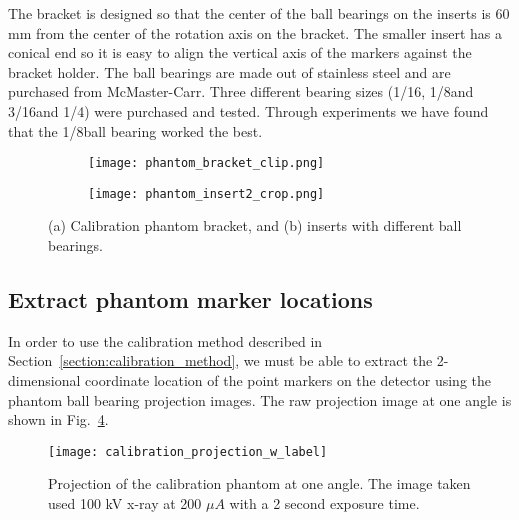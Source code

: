 The bracket is designed so that the center of the ball bearings on the inserts is 60 mm from the center of the rotation axis on the bracket.  The smaller insert has a conical end so it is easy to align the vertical axis of the markers against the bracket holder.  The ball bearings are made out of stainless steel and are purchased from McMaster-Carr.  Three different bearing sizes (1/16\inches, 1/8\inches and 3/16\inches and 1/4\inches) were purchased and tested.  Through experiments we have found that the 1/8\inches ball bearing worked the best.
%
\begin{figure}[ht]
	\begin{subfigure}[b]{0.3\linewidth}
	\texttt{[image: phantom\_bracket\_clip.png]}
	\label{fig:calibration_phantom_bracket}
	\caption{}
	\end{subfigure}
\hspace{0.2cm}
	\begin{subfigure}[b]{0.3\linewidth}
	\texttt{[image: phantom\_insert2\_crop.png]}
	\label{fig:calibration_phantom_insert}
	\caption{}
	\end{subfigure}
\caption{(a) Calibration phantom bracket, and (b) inserts with different ball bearings.}
\label{fig:calibration_phantom}
\end{figure}

\subsection{Extract phantom marker locations}
In order to use the calibration method described in Section~\ref{section:calibration_method}, we must be able to extract the 2-dimensional coordinate location of the point markers on the detector using the phantom ball bearing projection images.  The raw projection image at one angle is shown in Fig.~\ref{fig:calibration_projection}.
%
\begin{figure}[ht]
\centering
\texttt{[image: calibration\_projection\_w\_label]}
\caption{Projection of the calibration phantom at one angle.  The image taken used 100 kV x-ray at 200 $\mu A$ with a 2 second exposure time.}
\label{fig:calibration_projection}
\end{figure}

